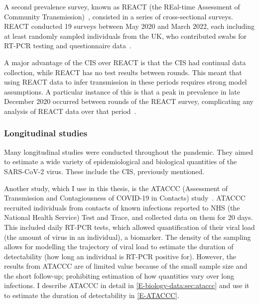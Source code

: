 \documentclass[thesis.tex]{subfiles}
\begin{document}
A second prevalence survey, known as REACT (the REal-time Assessment of Community Transmission)~\autocite{rileyResurgence,rileyREACT}, consisted in a series of cross-sectional surveys.
REACT conducted 19 surveys between May 2020 and March 2022, each including at least  randomly sampled individuals from the UK, who contributed swabs for RT-PCR testing and questionnaire data~\autocite{elliottTwin}.

A major advantage of the CIS over REACT is that the CIS had continual data collection, while REACT has no test results between rounds.
This meant that using REACT data to infer transmission in these periods requires strong model assumptions.
A particular instance of this is that a peak in prevalence in late December 2020 occurred between rounds of the REACT survey, complicating any analysis of REACT data over that period~\autocite{rileyREACTround8}.

\subsubsection{Longitudinal studies}

Many longitudinal studies were conducted throughout the pandemic.
They aimed to estimate a wide variety of epidemiological and biological quantities of the SARS-CoV-2 virus.
These include the CIS, previously mentioned.

Another study, which I use in this thesis, is the ATACCC (Assessment of Transmission and Contagiousness of COVID-19 in Contacts) study~\autocite{singanayagamCommunity,hakkiOnset}.
ATACCC recruited individuals from contacts of known infections reported to NHS (the National Health Service) Test and Trace, and collected data on them for 20 days.
This included daily RT-PCR tests, which allowed quantification of their viral load (the amount of virus in an individual), a biomarker.
The density of the sampling allows for modelling the trajectory of viral load to estimate the duration of detectability (how long an individual is RT-PCR positive for).
However, the results from ATACCC are of limited value because of the small sample size and the short follow-up; prohibiting estimation of how quantities vary over long infections.
I describe ATACCC in detail in \cref{E-biology-data:sec:ataccc} and use it to estimate the duration of detectability in \cref{E-ATACCC}.
\end{document}
